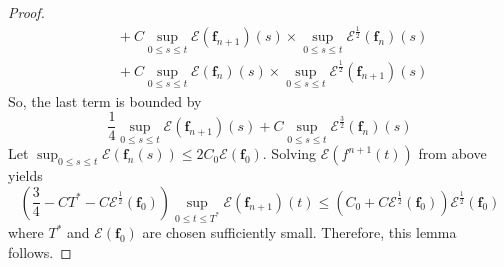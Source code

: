 \documentclass[reqno]{amsart}
\numberwithin{equation}{section}
\numberwithin{equation}{section}
\begin{document}
\begin{proof}
\begin{align*}
			&\quad + C \sup_{0 \leq s \leq t} \mathcal{E}(\mathbf{f}_{n+1})(s) \times\sup_{0 \leq s \leq t} \mathcal{E}^{\frac{1}{2}}(\mathbf{f}_n)(s)  \\
			&\quad + C \sup_{0 \leq s \leq t} \mathcal{E}(\mathbf{f}_n)(s) \times \sup_{0 \leq s \leq t} \mathcal{E}^{\frac{1}{2}}(\mathbf{f}_{n+1})(s)
		\end{align*}
		So, the last term is bounded by
		\begin{equation*}
			\frac{1}{4} \sup_{0 \leq s \leq t} \mathcal{E}(\mathbf{f}_{n+1})(s) + C \sup_{0 \leq s \leq t} \mathcal{E}^{\frac{3}{2}}(\mathbf{f}_n)(s)
		\end{equation*}
		Let $\sup_{0 \leq s \leq t} \mathcal{E}(\mathbf{f}_n(s)) \leq 2C_0\mathcal{E}(\mathbf{f}_0)$. Solving $\mathcal{E}(f^{n+1}(t))$ from above yields
		\begin{equation*}
			\left( \frac{3}{4} - CT^* - C\mathcal{E}^{\frac{1}{2}}(\mathbf{f}_0) \right)\sup_{0 \leq t \leq T^*} \mathcal{E}(\mathbf{f}_{n+1})(t) \leq \left( C_0 + C\mathcal{E}^{\frac{1}{2}}(\mathbf{f}_0) \right)\mathcal{E}^{\frac{1}{2}}(\mathbf{f}_0)
		\end{equation*}
		where $T^*$ and $\mathcal{E}(\mathbf{f}_0)$ are chosen sufficiently small. Therefore, this lemma follows.
		
	\end{proof}
	
\end{document}
